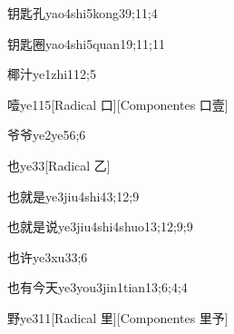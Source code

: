 \begin{verbete}{钥匙孔}{yao4shi5kong3}{9;11;4}
\end{verbete}

\begin{verbete}{钥匙圈}{yao4shi5quan1}{9;11;11}
\end{verbete}

\begin{verbete}{椰汁}{ye1zhi1}{12;5}
\end{verbete}

\begin{verbete}{噎}{ye1}{15}[Radical 口][Componentes 口壹]
\end{verbete}

\begin{verbete}{爷爷}{ye2ye5}{6;6}
\end{verbete}

\begin{verbete}{也}{ye3}{3}[Radical 乙]
\end{verbete}

\begin{verbete}{也就是}{ye3jiu4shi4}{3;12;9}
\end{verbete}

\begin{verbete}{也就是说}{ye3jiu4shi4shuo1}{3;12;9;9}
\end{verbete}

\begin{verbete}{也许}{ye3xu3}{3;6}
\end{verbete}

\begin{verbete}{也有今天}{ye3you3jin1tian1}{3;6;4;4}
\end{verbete}

\begin{verbete}{野}{ye3}{11}[Radical 里][Componentes 里予]
\end{verbete}

